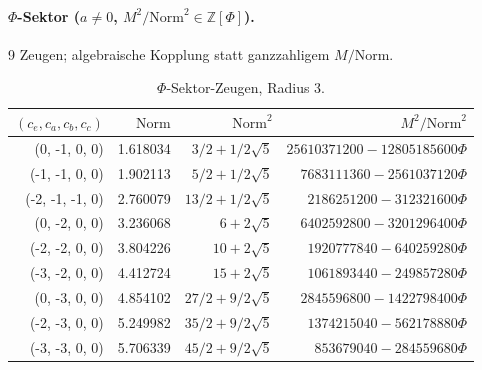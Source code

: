 \paragraph{$\Phi$-Sektor ($a\neq 0$, $M^2/\mathrm{Norm}^2\in\mathbb{Z}[\Phi]$).}
9 Zeugen; algebraische Kopplung statt ganzzahligem $M/\mathrm{Norm}$.

\begin{table}[ht]
  \centering
  \caption{$\Phi$-Sektor-Zeugen, Radius 3.}
  \label{tab:eabc-phi-r3}
  \begin{tabular}{rrrr}
    \toprule
    $(c_e,c_a,c_b,c_c)$ & $\mathrm{Norm}$ & $\mathrm{Norm}^2$ & $M^2/\mathrm{Norm}^2$ \\
    \midrule
    (0, -1, 0, 0) & 1.618034 & $3/2 + 1/2\sqrt{5}$ & $25610371200 - 12805185600\Phi$ \\
    (-1, -1, 0, 0) & 1.902113 & $5/2 + 1/2\sqrt{5}$ & $7683111360 - 2561037120\Phi$ \\
    (-2, -1, -1, 0) & 2.760079 & $13/2 + 1/2\sqrt{5}$ & $2186251200 - 312321600\Phi$ \\
    (0, -2, 0, 0) & 3.236068 & $6 + 2\sqrt{5}$ & $6402592800 - 3201296400\Phi$ \\
    (-2, -2, 0, 0) & 3.804226 & $10 + 2\sqrt{5}$ & $1920777840 - 640259280\Phi$ \\
    (-3, -2, 0, 0) & 4.412724 & $15 + 2\sqrt{5}$ & $1061893440 - 249857280\Phi$ \\
    (0, -3, 0, 0) & 4.854102 & $27/2 + 9/2\sqrt{5}$ & $2845596800 - 1422798400\Phi$ \\
    (-2, -3, 0, 0) & 5.249982 & $35/2 + 9/2\sqrt{5}$ & $1374215040 - 562178880\Phi$ \\
    (-3, -3, 0, 0) & 5.706339 & $45/2 + 9/2\sqrt{5}$ & $853679040 - 284559680\Phi$ \\
    \bottomrule
  \end{tabular}
\end{table}
